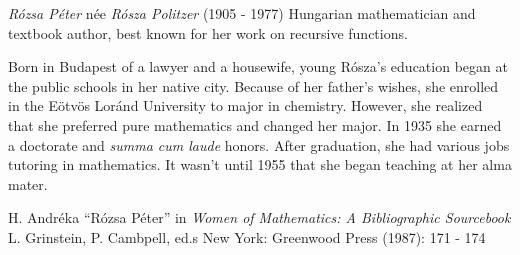 \documentclass[12pt]{article}
\begin{document}

\emph{R\'ozsa P\'eter} n\'ee \emph{R\'osza Politzer} (1905 - 1977) Hungarian mathematician and textbook author, best known for her work on recursive functions.

Born in Budapest of a lawyer and a housewife, young R\'osza's education began  at the public schools in her native city. Because of her father's wishes, she enrolled in the E\"otv\"os Lor\'and University to major in chemistry. However, she realized that she preferred pure mathematics and changed her major. In 1935 she earned a doctorate and \emph{summa cum laude} honors. After graduation, she had various jobs tutoring in mathematics. It wasn't until 1955 that she began teaching at her alma mater.

\begin{thebibliography}{1}
 H. Andr\'eka ``R\'ozsa P\'eter'' in {\it Women of Mathematics: A Bibliographic Sourcebook} L. Grinstein, P. Cambpell, ed.s New York: Greenwood Press (1987): 171 - 174
\end{thebibliography}
\end{document}
